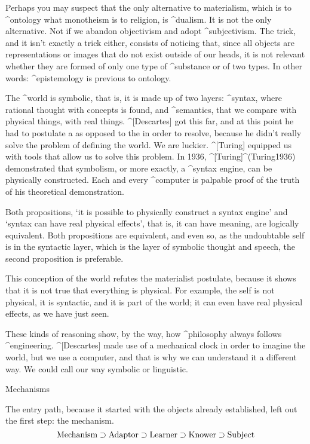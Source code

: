 Perhaps you may suspect that the only alternative to materialism, which
is to ^{ontology} what monotheism is to religion, is ^{dualism}. It is
not the only alternative. Not if we abandon objectivism and adopt
^{subjectivism}. The trick, and it isn't exactly a trick either,
consists of noticing that, since all objects are representations or
images that do not exist outside of our heads, it is not relevant
whether they are formed of only one type of ^{substance} or of two
types. In other words: ^{epistemology} is previous to ontology.

The ^{world} is symbolic, that is, it is made up of two layers:
^{syntax}, where rational thought with concepts is found, and
^{semantics}, that we compare with physical things, with real things.
^[Descartes] got this far, and at this point he had to postulate a
 as opposed to the  in
order to resolve, because he didn't really solve the problem of defining
the world. We are luckier. ^[Turing] equipped us with tools that allow
us to solve this problem. In 1936, ^[Turing]^(Turing1936) demonstrated
that symbolism, or more exactly, a ^{syntax engine}, can be physically
constructed. Each and every ^{computer} is palpable proof of the truth
of his theoretical demonstration.

Both propositions, `it is possible to physically construct a syntax
engine' and `syntax can have real physical effects', that is, it can
have meaning, are logically equivalent. Both propositions are
equivalent, and even so, as the undoubtable self is in the syntactic
layer, which is the layer of symbolic thought and speech, the second
proposition is preferable.

This conception of the world refutes the materialist postulate, because
it shows that it is not true that everything is physical. For example,
the self is not physical, it is syntactic, and it is part of the world;
it can even have real physical effects, as we have just seen.

These kinds of reasoning show, by the way, how ^{philosophy} always
follows  ^{engineering}. ^[Descartes] made use of a mechanical clock in
order to imagine the world, but we use a computer, and that is why we
can understand it a different way. We could call our way symbolic or
linguistic.


\Section Mechanisms

The entry path, because it started with the objects already established,
left out the first step: the mechanism.
$$\hbox{Mechanism} \supset \hbox{Adaptor} \supset
  \hbox{Learner} \supset \hbox{Knower} \supset \hbox{Subject}
\abovedisplayskip=9pt
\belowdisplayskip=9pt
$$

